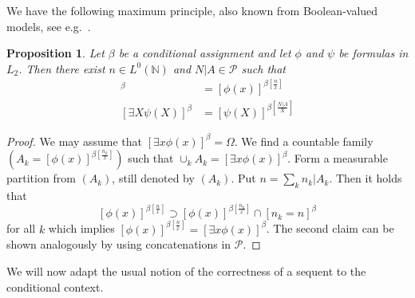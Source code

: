 \documentclass{jloganal}
\numberwithin{equation}{section}
\theoremstyle{plain}
\newtheorem{proposition}[subsection]{Proposition}
\renewcommand{\geq}{\geqslant}
\begin{document}
We have the following maximum principle, also known from Boolean-valued models, see e.g.~\cite[Chapter 1]{bell2005set}. 
\begin{proposition}\label{p1}
Let $\beta$ be a conditional assignment and let $\phi$ and $\psi$ be formulas in $L_2$. 
Then there exist $n\in L^0(\mathbb{N})$ and $N|A\in \mathcal{P}$ such that 
\begin{align*}
[\exists x \phi(x)]^{ \beta}&=[\phi(x)]^{ \beta[\frac{n}{x}]} \\
[\exists X \psi(X)]^{ \beta}&=[\psi(X)]^{ \beta[\frac{N|A}{X}]}
\end{align*}
\end{proposition}
\begin{proof}
We may assume that $[\exists x \phi(x)]^{ \beta}=\Omega$. 
We find a countable family $(A_k=[\phi(x)]^{ \beta[\frac{n_k}{x}]})$ such that $\cup_{k} A_k=[\exists x \phi(x)]^{ \beta}$. 
Form a measurable partition from $(A_k)$, still denoted by $(A_k)$. 
Put $n=\sum_k n_k|A_k$. 
Then it holds that 
\[
[\phi(x)]^{ \beta[\frac{n}{x}]}\supset [\phi(x)]^{ \beta[\frac{n_k}{x}]}\cap [n_k=n]^\beta
\]
for all $k$ which implies $[\phi(x)]^{ \beta[\frac{n}{x}]}=[\exists x \phi(x)]^{ \beta}$.  
The second claim can be shown analogously by using concatenations in $\mathcal{P}$. 
\end{proof}

We will now adapt the usual notion of the correctness of a sequent to the conditional context.
\end{document}
